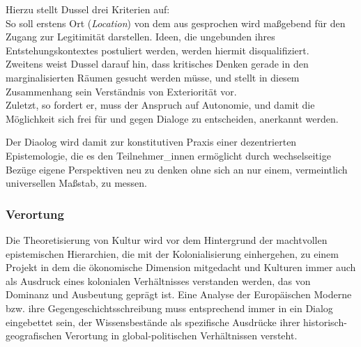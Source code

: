 Hierzu stellt Dussel drei Kriterien auf: \\
So soll erstens Ort (\textit{Location}) von dem
aus gesprochen wird maßgebend für den Zugang zur Legitimität darstellen. Ideen,
die ungebunden ihres Entstehungskontextes postuliert werden, werden hiermit
disqualifiziert.\\
 Zweitens weist Dussel darauf hin, dass kritisches Denken gerade
in den marginalisierten Räumen gesucht werden müsse, und stellt in diesem
Zusammenhang sein Verständnis von Exteriorität vor. \\
Zuletzt, so fordert er, muss
der Anspruch auf Autonomie, und damit die Möglichkeit sich frei für und gegen
Dialoge zu entscheiden, anerkannt werden.

Der Diaolog wird damit zur konstitutiven Praxis einer dezentrierten
Epistemologie, die es den Teilnehmer\_innen ermöglicht durch wechselseitige
Bezüge eigene Perspektiven neu zu denken ohne sich an nur einem, vermeintlich
universellen Maßstab, zu messen.

\subsubsection{Verortung}

Die Theoretisierung von Kultur wird vor dem Hintergrund der machtvollen
epistemischen Hierarchien, die mit der Kolonialisierung einhergehen, zu einem
Projekt in dem die ökonomische Dimension mitgedacht und Kulturen immer auch als
Ausdruck eines kolonialen Verhältnisses verstanden werden, das von Dominanz und
Ausbeutung geprägt ist.\footnotemark {} Eine Analyse der Europäischen Moderne bzw. ihre
Gegengeschichtsschreibung muss entsprechend immer in ein Dialog eingebettet
sein, der Wissensbestände als spezifische Ausdrücke ihrer
historisch-geografischen Verortung in global-politischen Verhältnissen versteht.

